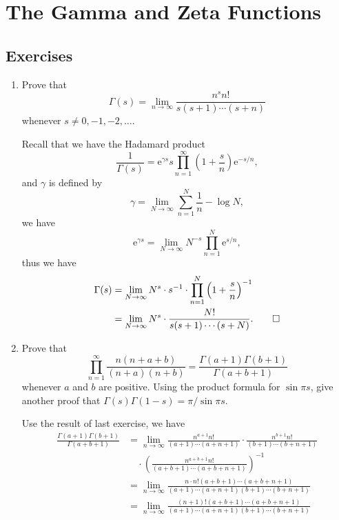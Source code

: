 \documentclass[11pt]{report}
\theoremstyle{mythm}
\let\oldendproof\endproof
\renewenvironment{proof}[1][\proofname]{%
  \oldproof[\normalfont \bfseries #1]%
}{\oldendproof}
\renewcommand*{\proofname}{Proof}
\theoremstyle{myans}
\newcommand{\me}{\mathrm{e}}
\begin{document}
\setcounter{chapter}{5}
\chapter{The Gamma and Zeta Functions}

\section{Exercises}

\begin{enumerate}
  \item Prove that
  \[ \Gamma(s) = \lim_{n\to \infty} \frac{n^sn!}{s(s+1)\cdots(s+n)} \]
  whenever $s\neq 0, -1, -2, \dots$.
  \begin{proof}
    Recall that we have the Hadamard product
    \[ \frac 1{\Gamma(s)} = \me^{\gamma s} s\prod_{n=1}^\infty
    \left(1 + \frac s n\right)\me^{-s/n}, \]
    and $\gamma$ is defined by
    \[ \gamma = \lim_{N\to\infty} \sum_{n=1}^N \frac 1 n - \log N, \]
    we have
    \[ \me^{\gamma s} = \lim_{N\to \infty} N^{-s}\prod_{n=1}^{N} \me^{s/n}, \]
    thus we have
    \begin{align*}
      \Gamma(s) &= \lim_{N\to \infty} N^{s} \cdot s^{-1}\cdot \prod_{n=1}^N \left(1 + \frac s n\right)^{-1}\\
      &= \lim_{N\to \infty} N^{s} \cdot \frac{N!}{s(s+1)\cdots(s+N)}. \qedhere
    \end{align*}
  \end{proof}
  \item Prove that
  \[ \prod_{n=1}^\infty \frac{n(n+a+b)}{(n+a)(n+b)} = \frac{\Gamma(a+1)\Gamma(b+1)}{\Gamma(a+b+1)} \]
  whenever $a$ and $b$ are positive. Using the product formula for $\sin \pi s$, give another
  proof that $\Gamma(s)\Gamma(1 - s) = \pi/ \sin \pi s$.
  \begin{proof}
    Use the result of last exercise, we have
    \begin{align*}
      \frac{\Gamma(a+1)\Gamma(b+1)}{\Gamma(a+b+1)}
      &= \lim_{n\to \infty} \frac{n^{a+1}n!}{(a+1)\cdots(a+n+1)}
      \cdot \frac{n^{b+1}n!}{(b+1)\cdots(b+n+1)}\\
      & \quad \cdot \left(\frac{n^{a+b+1}n!}{(a+b+1)\cdots(a+b+n+1)}\right)^{-1}\\
      &= \lim_{n\to\infty} \frac{n\cdot n!(a+b+1)\cdots(a+b+n+1)}{(a+1)\cdots(a+n+1)(b+1)\cdots(b+n+1)}\\
      &= \lim_{n\to\infty} \frac{(n+1)!(a+b+1)\cdots(a+b+n+1)}{(a+1)\cdots(a+n+1)(b+1)\cdots(b+n+1)}\\

\end{align*}
\end{proof}
\end{enumerate}
\end{document}
